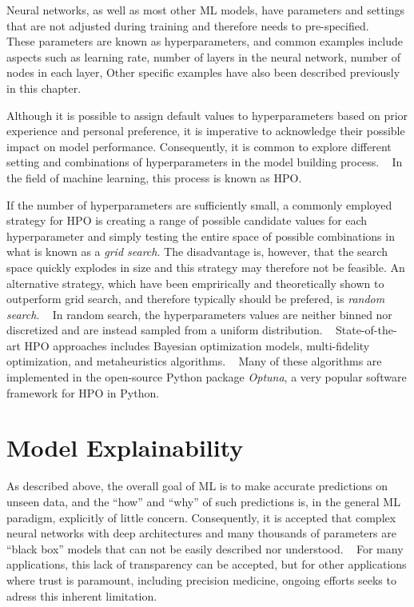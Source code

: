 Neural networks, as well as most other \ac{ML} models,
have parameters and settings that are not adjusted 
during training and therefore needs to pre-specified.
~\autocite{goodfellow2016deep}
These parameters are known as hyperparameters, 
and common examples include aspects such as 
learning rate,
number of layers in the neural network,
number of nodes in each layer,
Other specific examples have also been described previously in this chapter.

Although it is possible to assign default values to hyperparameters 
based on prior experience and personal preference, 
it is imperative to acknowledge their possible impact on model performance.
Consequently, it is common to explore different setting and combinations
of hyperparameters in the model building process.
~\autocite{goodfellow2016deep}
In the field of machine learning, this process is known as \ac{HPO}.

If the number of hyperparameters are sufficiently small,
a commonly employed strategy for \ac{HPO} 
is creating a range of possible candidate values 
for each hyperparameter and 
simply testing the entire space of 
possible combinations in what is known as a \emph{grid search}.
The disadvantage is, however, that the search space quickly 
explodes in size and this strategy may therefore not be feasible.
An alternative strategy, 
which have been emprirically and theoretically shown to outperform
grid search, and therefore typically should be prefered,  
is \emph{random search}.
~\autocite{bergstraRandom2012}
In random search, the hyperparameters values are neither binned nor
discretized and are instead sampled from a uniform distribution.
~\autocite{bergstraRandom2012}
State-of-the-art \ac{HPO} approaches includes Bayesian optimization 
models, multi-fidelity optimization, and metaheuristics algorithms.
~\autocite{yangHyperparameter2020}
Many of these algorithms are implemented in the 
open-source Python package \textit{Optuna},
a very popular software framework for \ac{HPO} in Python.
~\autocite{akibaOptuna2019}

\section{Model Explainability}

As described above, the overall goal of \ac{ML} 
is to make accurate predictions on unseen data,
and the \enquote{how} and \enquote{why} of such predictions is,
in the general \ac{ML} paradigm, 
explicitly of little concern.
Consequently, it is accepted that complex neural networks
with deep architectures and many thousands of parameters 
are \enquote{black box} models that can not 
be easily described nor understood.
~\autocite{russellArtificial2009}
For many applications, 
this lack of transparency can be accepted,
but for other applications where trust is paramount, 
including precision medicine,
ongoing efforts seeks to adress this inherent limitation.
~\autocite{vanderveldenExplainable2022}

